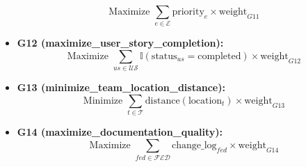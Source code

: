 \documentclass{article}
\begin{document}
\begin{itemize}
    \[
    \text{Maximize } \sum_{e \in \mathcal{E}} \text{priority}_e \times \text{weight}_{G11}
    \]
    \item \textbf{G12 (maximize\_user\_story\_completion):}
    \[
    \text{Maximize } \sum_{us \in \mathcal{US}} \mathbb{I}(\text{status}_{us} = \text{completed}) \times \text{weight}_{G12}
    \]
    \item \textbf{G13 (minimize\_team\_location\_distance):}
    \[
    \text{Minimize } \sum_{t \in \mathcal{T}} \text{distance}(\text{location}_t) \times \text{weight}_{G13}
    \]
    \item \textbf{G14 (maximize\_documentation\_quality):}
    \[
    \text{Maximize } \sum_{fed \in \mathcal{FED}} \text{change\_log}_{fed} \times \text{weight}_{G14}
    \]
\end{itemize}
\end{document}
